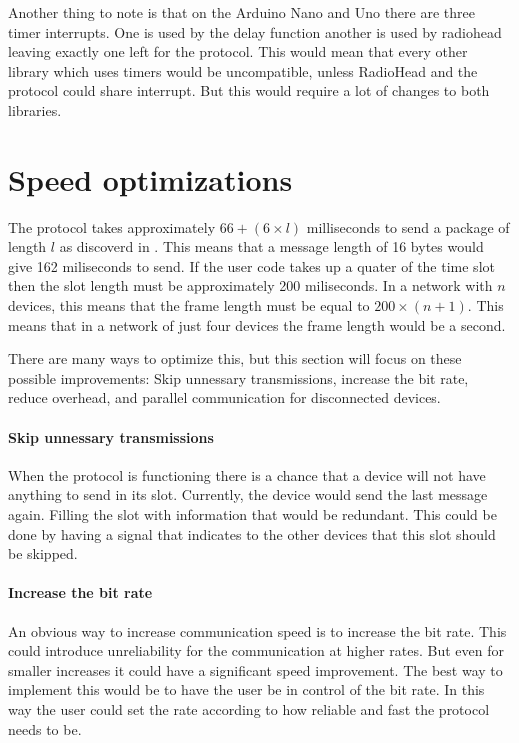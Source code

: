 Another thing to note is that on the Arduino Nano and Uno there are three timer interrupts.
One is used by the delay function another is used by radiohead leaving exactly one left for the protocol.
This would mean that every other library which uses timers would be uncompatible, unless RadioHead and the protocol could share interrupt.
But this would require a lot of changes to both libraries.

\section{Speed optimizations}

The protocol takes approximately $66 + (6 \times l)$ milliseconds to send a package of length $l$ as discoverd in . 
This means that a message length of 16 bytes would give 162 miliseconds to send.
If the user code takes up a quater of the time slot then the slot length must be approximately 200 miliseconds.
In a network with $n$ devices, this means that the frame length must be equal to $200 \times (n + 1)$.
This means that in a network of just four devices the frame length would be a second.

There are many ways to optimize this, but this section will focus on these possible improvements: 
Skip unnessary transmissions, increase the bit rate, reduce overhead, and parallel communication for disconnected devices.

\paragraph{Skip unnessary transmissions} 
When the protocol is functioning there is a chance that a device will not have anything to send in its slot.
Currently, the device would send the last message again.
Filling the slot with information that would be redundant.
This could be done by having a signal that indicates to the other devices that this slot should be skipped.

\paragraph{Increase the bit rate} 
An obvious way to increase communication speed is to increase the bit rate.
This could introduce unreliability for the communication at higher rates. 
But even for smaller increases it could have a significant speed improvement.
The best way to implement this would be to have the user be in control of the bit rate.
In this way the user could set the rate according to how reliable and fast the protocol needs to be.

